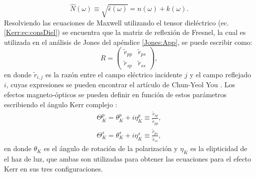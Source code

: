 \begin{equation}
\hat{N} (\omega) \equiv \sqrt{\hat{\epsilon} (\omega)} = n(\omega) + k(\omega). \label{Kerr:ec:N}
\end{equation}  
Resolviendo las ecuaciones de Maxwell utilizando el tensor diel\'ectrico (ec. \ref{Kerr:ec:consDiel}) se encuentra que  la matriz de reflexi\'on de Fresnel, la cual es utilizada en el an\'alisis de Jones del ap\'endice \ref{Jones:App}, se puede escribir como:
\begin{equation}
R=
\begin{pmatrix}
\tilde{r}_{pp}  &  \tilde{r}_{ps} \\
\tilde{r}_{sp}  &  \tilde{r}_{ss}
\end{pmatrix}
\label{Kerr:ec:ref},
\end{equation}
en donde $\tilde{r}_{i,j}$ es la raz\'on entre el campo eléctrico incidente $j$ y el campo reflejado $i$, cuyas expresiones se pueden encontrar el art\'iculo de Chun-Yeol You \cite{You_1996}. Los efectos magneto-\'opticos se pueden definir en funci\'on de estos par\'ametros escribiendo el \'angulo Kerr complejo \cite{You_1996}:
\begin{subequations}
	\begin{gather}
	\Theta_K ^p = \theta_K^p + i \eta_K^p \equiv \frac{\tilde{r}_{sp}}{\tilde{r}_{pp}}, \label{Kerr:ec:AngKp} \\
	\Theta_K ^s = \theta_K^s + i \eta_K^s \equiv \frac{\tilde{r}_{ps}}{\tilde{r}_{ss}}, \label{Kerr:ec:AngKs}
	\end{gather}
\end{subequations}
en donde $\theta_K$ es el \'angulo de rotaci\'on de la polarizaci\'on  y $\eta_K$ es la elipticidad de el haz de luz, que ambas  son utilizadas para obtener las ecuaciones para el efecto Kerr en sus tres configuraciones.
